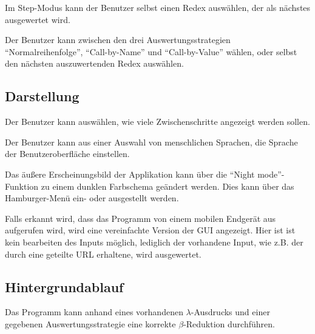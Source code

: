\documentclass[parskip=full,11pt,twoside]{scrartcl}
\begin{document}
Im Step-Modus kann der Benutzer selbst einen Redex auswählen, der als nächstes ausgewertet wird.

Der Benutzer kann zwischen den drei Auswertungsstrategien \enquote{Normalreihenfolge}, \enquote{Call-by-Name} und \enquote{Call-by-Value} wählen, oder selbst den nächsten auszuwertenden Redex auswählen.








\subsection{Darstellung}

Der Benutzer kann auswählen, wie viele Zwischenschritte angezeigt werden sollen.

Der Benutzer kann aus einer Auswahl von menschlichen Sprachen, die Sprache der Benutzeroberfläche einstellen.

Das äußere Erscheinungsbild der Applikation kann über die \enquote{Night mode}-Funktion zu einem dunklen Farbschema geändert werden. Dies kann über das Hamburger-Menü ein- oder ausgestellt werden.

Falls erkannt wird, dass das Programm von einem mobilen Endgerät aus aufgerufen wird, wird eine vereinfachte Version der GUI angezeigt. Hier ist ist kein bearbeiten des Inputs möglich, lediglich der vorhandene Input, wie z.B. der durch eine geteilte URL erhaltene, wird ausgewertet.




\subsection{Hintergrundablauf}

Das Programm kann anhand eines vorhandenen $\lambda$-Ausdrucks und einer gegebenen Auswertungsstrategie eine korrekte $\beta$-Reduktion durchführen.
\end{document}
